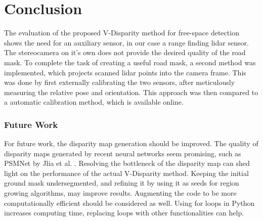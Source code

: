 
\chapter{Conclusion}
\label{chp:Conclusion}

The evaluation of the proposed V-Disparity method for free-space detection shows the need for an auxiliary sensor, in our case a range finding lidar sensor. The stereocamera on it's own does not provide the desired quality of the road mask. To complete the task of creating a useful road mask, a second method was implemented, which projects scanned lidar points into the camera frame. This was done by first externally calibrating the two sensors, after meticulously measuring the relative pose and orientation. This approach was then compared to a automatic calibration method, which is available online.

\subsection{Future Work}
For future work, the disparity map generation should be improved. The quality of disparity maps generated by recent neural networks seem promising, such as PSMNet by Jlia et al.  \cite{DBLP:journals/corr/abs-1803-08669}. Resolving the bottleneck of the disparity map can shed light on the performance of the actual V-Disparity method. Keeping the initial ground mask undersegmented, and refining it by using it as seeds for region growing algorithms, may improve results.
Augmenting the code to be more computationally efficient should be considered as well. Using for loops in Python increases computing time, replacing loops with other functionalities can help.
